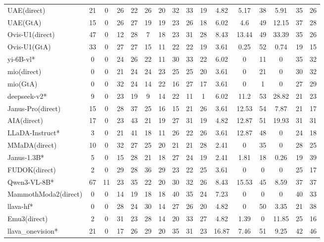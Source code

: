 \documentclass{article}
\theoremstyle{plain}
\theoremstyle{definition}
\theoremstyle{remark}
\begin{document}
\begin{table}[!htbp]
{\begin{tabular}{@{}lccccccccccccccc@{}}
UAE(direct) & 21 & 0 & 26 & 22 & 26 & 20 & 32 & 33 & 19 & 4.82 & 5.17 & 38 & 5.91 & 35 & 26 \\
UAE(GtA) & 15 & 0 & 26 & 27 & 19 & 19 & 23 & 26 & 18 & 6.02 & 4.6 & 49 & 12.15 & 37 & 28 \\
Ovis-U1(direct) & 47 & 0 & 12 & 28 & 7 & 18 & 23 & 31 & 28 & 8.43 & 13.44 & 49 & 33.39 & 35 & 26 \\
Ovis-U1(GtA) & 33 & 0 & 27 & 27 & 15 & 11 & 22 & 22 & 19 & 3.61 & 0.25 & 52 & 0.74 & 19 & 15 \\
\midrule
\rowcolor{gray!12}
yi-6B-vl* & 0 & 0 & 24 & 26 & 22 & 11 & 30 & 33 & 22 & 6.02 & 0 & 11 & 0 & 35 & 32 \\
mio(direct) & 0 & 0 & 21 & 24 & 24 & 23 & 25 & 25 & 20 & 3.61 & 0 & 21 & 0 & 30 & 32 \\
mio(GtA) & 0 & 0 & 32 & 24 & 14 & 22 & 16 & 27 & 17 & 3.61 & 0 & 1 & 0 & 27 & 29 \\
\midrule
\rowcolor{gray!12}
deepseek-v2* & 9 & 0 & 23 & 19 & 9 & 14 & 22 & 11 & 1 & 6.02 & 11.2 & 53 & 28.82 & 21 & 23 \\
Janus-Pro(direct) & 15 & 0 & 28 & 37 & 25 & 16 & 15 & 21 & 26 & 3.61 & 12.53 & 54 & 7.87 & 21 & 17 \\
AIA(direct) & 17 & 0 & 23 & 43 & 21 & 19 & 27 & 31 & 19 & 4.82 & 12.87 & 51 & 19.93 & 31 & 31 \\
\midrule
\rowcolor{gray!12}
LLaDA-Instruct* & 3 & 0 & 21 & 41 & 18 & 11 & 26 & 22 & 26 & 3.61 & 12.87 & 48 & 0 & 24 & 18 \\
MMaDA(direct) & 10 & 0 & 32 & 27 & 25 & 20 & 21 & 21 & 28 & 2.41 & 0 & 35 & 0 & 28 & 25 \\
\midrule
\rowcolor{gray!12}
Janus-1.3B* & 5 & 0 & 15 & 28 & 21 & 18 & 27 & 24 & 19 & 2.41 & 1.81 & 18 & 0.26 & 19 & 39 \\
FUDOK(direct) & 2 & 0 & 29 & 28 & 36 & 29 & 23 & 22 & 25 & 3.61 & 0 & 0 & 0 & 25 & 17 \\
\midrule
\rowcolor{gray!12}
Qwen3-VL-8B* & 67 & 11 & 23 & 35 & 22 & 20 & 30 & 32 & 26 & 8.43 & 15.53 & 45 & 8.59 & 37 & 37 \\
MammothModa2(direct) & 0 & 0 & 14 & 19 & 18 & 18 & 40 & 35 & 24 & 7.23 & 0 & 0 & 0 & 40 & 33 \\
\midrule
\rowcolor{gray!12}
llava-hf* & 0 & 0 & 28 & 24 & 30 & 14 & 27 & 26 & 20 & 4.82 & 0 & 50 & 3.35 & 21 & 38 \\
Emu3(direct) & 2 & 0 & 31 & 23 & 28 & 14 & 20 & 33 & 27 & 4.82 & 1.39 & 0 & 11.85 & 25 & 16 \\
\midrule
\rowcolor{gray!12}
llava\_onevision* & 21 & 0 & 17 & 26 & 29 & 20 & 35 & 31 & 23 & 16.87 & 7.46 & 51 & 9.25 & 42 & 46 \\

\end{tabular}}
\end{table}
\end{document}
